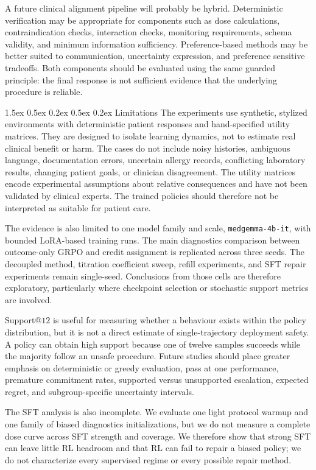 \documentclass{article}
\makeatletter
\renewcommand{\paragraph}{%
  \@startsection{paragraph}{4}{\z@}%
                {1.5ex \@plus 0.5ex \@minus 0.2ex}%
                {0.5ex \@plus 0.2ex}%
                {\normalsize\bf}}
\makeatother
\begin{document}
A future clinical alignment pipeline will probably be hybrid. Deterministic
verification may be appropriate for components such as dose calculations,
contraindication checks, interaction checks, monitoring requirements, schema
validity, and minimum information sufficiency. Preference-based methods may be
better suited to communication, uncertainty expression, and preference sensitive
tradeoffs. Both components should be evaluated using the same guarded principle:
the final response is not sufficient evidence that the underlying procedure is
reliable.

\paragraph{Limitations}
The experiments use synthetic, stylized environments with deterministic patient
responses and hand-specified utility matrices. They are designed to isolate
learning dynamics, not to estimate real clinical benefit or harm. The cases do
not include noisy histories, ambiguous language, documentation errors, uncertain
allergy records, conflicting laboratory results, changing patient goals, or
clinician disagreement. The utility matrices encode experimental assumptions
about relative consequences and have not been validated by clinical experts.
The trained policies should therefore not be interpreted as suitable for patient
care.

The evidence is also limited to one model family and scale,
\texttt{medgemma-4b-it}, with bounded LoRA-based training runs. The main
diagnostics comparison between outcome-only GRPO and credit assignment is
replicated across three seeds. The decoupled method, titration coefficient sweep,
refill experiments, and SFT repair experiments remain single-seed. Conclusions
from those cells are therefore exploratory, particularly where checkpoint
selection or stochastic support metrics are involved.

Support@$12$ is useful for measuring whether a behaviour exists within the policy
distribution, but it is not a direct estimate of single-trajectory deployment
safety. A policy can obtain high support because one of twelve samples succeeds
while the majority follow an unsafe procedure. Future studies should place greater
emphasis on deterministic or greedy evaluation, pass at one performance,
premature commitment rates, supported versus unsupported escalation, expected
regret, and subgroup-specific uncertainty intervals.

The SFT analysis is also incomplete. We evaluate one light protocol warmup and one
family of biased diagnostics initializations, but we do not measure a complete dose
curve across SFT strength and coverage. We therefore show that strong SFT can leave
little RL headroom and that RL can fail to repair a biased policy; we do not
characterize every supervised regime or every possible repair method.
\end{document}

